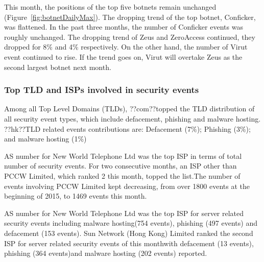 \documentclass[11pt]{article}
\begin{document}
This month, the positions of the top five botnets remain unchanged (Figure~\ref{fig:botnetDailyMax}).
The dropping trend of the top botnet, Conficker, was flattened. In the past three months, the number of Conficker events was roughly unchanged.
The dropping trend of Zeus and ZeroAccess continued, they dropped for 8\% and 4\% respectively. On the other hand, the number of Virut event continued to rise. If the trend goes on, Virut will overtake Zeus as the second largest botnet next month.
\FloatBarrier
\subsubsection*{Top TLD and ISPs involved in security events}
Among all Top Level Domains (TLDs), ??com??topped the TLD distribution of all security event types, which include defacement, phishing and malware hosting.
??hk??TLD related events contributions are: Defacement (7\%); Phishing (3\%); and malware hosting (1\%)

AS number for New World Telephone Ltd was the top ISP in terms of total number of security events. For two consecutive months, an ISP other than PCCW Limited, which ranked 2 this month, topped the list.The number of events involving PCCW Limited kept decreasing, from over 1800 events at the beginning of 2015, to 1469 events this month.

AS number for New World Telephone Ltd was the top ISP for server related security events including malware hosting(754 events), phishing (497 events) and defacement (153 events).
Sun Network (Hong Kong) Limited ranked the second ISP for server related security events of this monthwith defacement (13 events), phishing (364 events)and malware hosting (202 events) reported.
\pagebreak
\FloatBarrier
\end{document}
